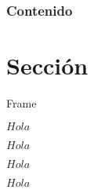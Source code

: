 

    \frame{\titlepage}
	\begin{frame}
		\frametitle{Contenido}
		\tableofcontents
	\end{frame}
    \section{Sección}
	\begin{frame}{Frame}
    \begin{mdefinition}[Hola]
        $Hola$
    \end{mdefinition}
    \begin{mtheorem}[Hola]
        $Hola$
    \end{mtheorem}
    \begin{axiom}[Hola]
        $Hola$
    \end{axiom}
    \begin{coll}[Hola]
        $Hola$
    \end{coll}
	\end{frame}

